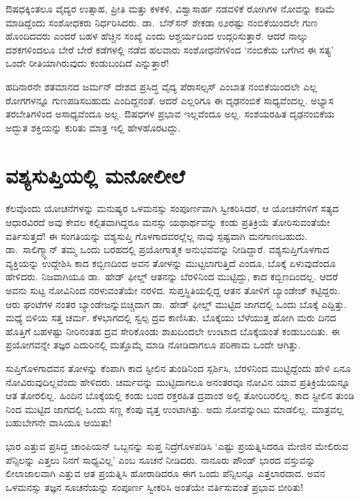 ಔಷಧಕ್ಕಿಂತಲೂ ವೈದ್ಯರ ಉತ್ಸಾಹ, ಪ್ರೀತಿ ಮತ್ತು ಕಳಕಳಿ, ವಿಶ್ವಾಸಾರ್ಹ ನಡವಳಿಕೆ ರೋಗಿಗಳ ನೋವನ್ನು ಕಡಿಮೆ ಮಾಡಿದ್ದೆಂದು ಸಂಶೋಧಕರು ನಿರ್ಧರಿಸಿದರು. ಡಾ.\ ಬೆನ್​ಸನ್ ಶೇಕಡಾ ೮೨ರಷ್ಟು ನಂಬಿಕೆಯಿಂದಲೇ ಗುಣ ಹೊಂದಿದವರು ಎಂದರೆ ಬಹಳ ಹೆಚ್ಚಿನ ಸಂಖ್ಯೆ ಎಂದು ಆಶ್ಚರ್ಯದಿಂದ ಉದ್ಗರಿಸುತ್ತಾರೆ. ಆದರೆ ನಾಲ್ಕು ದಶಕಗಳಿಂದಲೂ ಬೇರೆ ಬೇರೆ ಕಡೆಗಳಲ್ಲಿ ನಡೆದ ಹಲವಾರು ಸಂಶೋಧನೆಗಳಿಂದ ‘ನಂಬಿಕೆಯ ಬಗೆಗಿನ ಈ ಸತ್ಯ’ ಒಂದೇ ರೀತಿಯಾಗಿರುವುದು ಕಂಡುಬಂದಿದೆ ಎನ್ನುತ್ತಾರೆ!

ಹದಿನಾರನೇ ಶತಮಾನದ ಜರ್ಮನ್ ದೇಶದ ಪ್ರಸಿದ್ಧ ವೈದ್ಯ ಪೆರಾಸಲ್ಸಸ್ ಎಂಬಾತ ನಂಬಿಕೆ\-ಯಿಂದಲೇ ಎಲ್ಲ ರೋಗಗಳನ್ನೂ ಗುಣಪಡಿಸಬಹುದು ಎಂದಿದ್ದನಂತೆ. ಆದರೆ ಎಲ್ಲರಿಗೂ ಈ ದೃಢನಂಬಿಕೆ ಸಾಧ್ಯವೆಂದಲ್ಲ. ಅಭ್ಯಾಸ ತರಬೇತಿಗಳಿಂದ ಅಸಾಧ್ಯವೆಂದೂ ಅಲ್ಲ. ಔಷಧಗಳ ಪ್ರಭಾವ ಇಲ್ಲವೆಂದೂ ಅಲ್ಲ. ಸಂಶಯರಹಿತ ದೃಢನಂಬಿಕೆಯ ಅದ್ಭುತ ಶಕ್ತಿಯನ್ನು ಕುರಿತು ಮಾತ್ರ ಇಲ್ಲಿ ಹೇಳಹೊರಟದ್ದು.


\section*{ವಶ್ಯಸುಪ್ತಿಯಲ್ಲಿ ಮನೋಲೀಲೆ}


ಕೆಲವೊಂದು ಯೋಚನೆಗಳನ್ನು ಮನುಷ್ಯರ ಒಳಮನಸ್ಸು ಸಂಪೂರ್ಣವಾಗಿ ಸ್ವೀಕರಿಸಿದರೆ, ಆ ಯೋಚನೆಗಳಿಗೆ ಸತ್ಯದ ಆಧಾರವಿರದೆ ಅವು ಕೇವಲ ಕಲ್ಪಿತವಾಗಿದ್ದರೂ ಮನಸ್ಸು ಯಥಾರ್ಥವನ್ನು ಕಂಡು ಪ್ರತಿಕ್ರಿಯೆ ತೋರಿಸುವಂತೆಯೇ ವರ್ತಿಸುತ್ತದೆ! ಈ ಸಂಗತಿಯನ್ನು ವಶ್ಯಸುಪ್ತಿ ಗೊಳಗಾದವರಲ್ಲೆಲ್ಲ ನಾವು ಸ್ಪಷ್ಟವಾಗಿ ಮನಗಾಣಬಹುದು. ಡಾ.\ ಸಾಲಿಗ್ಮ್ಯಾನ್ ತಮ್ಮ ಒಂದು ಬರಹದಲ್ಲಿ ಪ್ರಯೋಗಾತ್ಮಕ ಅನುಭವವನ್ನು ನೀಡಿದ್ದಾರೆ. ವಶ್ಯಸುಪ್ತಿಗೊಳಗಾದ ವ್ಯಕ್ತಿಯನ್ನು ಉದ್ದೇಶಿಸಿ ಕಾದ ಕಬ್ಬಿಣದಿಂದ ಅವನ ತೋಳನ್ನು ಮುಟ್ಟಲಾಗುತ್ತಿದೆ ಎಂದೂ, ಬೊಕ್ಕೆ ಏಳುವುದೆಂದೂ ಹೇಳಿದರು. ನಿಜವಾಗಿಯೂ ಡಾ.\ ಹೇಡ್ ಫೀಲ್ಡ್ ಆತನನ್ನು ಬೆರಳಿನಿಂದ ಮುಟ್ಟಿದ್ದು, ಕಾದ ಕಬ್ಬಿಣದಿಂದಲ್ಲ. ಆದರೆ ಅವನು ಸುಟ್ಟ ನೋವಿನಿಂದ ನರಳುವಂತೆಯೇ ನರಳಿದ. ಸುಪ್ತಸ್ಥಿತಿಯಲ್ಲಿದ್ದ ಆತನ ತೋಳಿಗೆ ಬ್ಯಾಂಡೇಜ್ ಕಟ್ಟಿದ್ದರು. ಆರು ಘಂಟೆಗಳ ನಂತರ ಬ್ಯಾಂಡೇಜನ್ನು\break ಬಿಚ್ಚಿದಾಗ ಡಾ.\ ಹೇಡ್ ಫೀಲ್ಡ್ ಮುಟ್ಟಿದ ಜಾಗದಲ್ಲಿ ಒಂದು ಬೊಕ್ಕೆ ಎದ್ದಿತ್ತು. ಮಧ್ಯೆ ಬಿಳಿಯ ಸತ್ತ ಚರ್ಮ. ಕೆಳಭಾಗದಲ್ಲಿ ಸ್ವಲ್ಪ ದ್ರವ ಕಾಣಿಸಿತು. ಬೊಕ್ಕೆಯು ಬೆಳೆಯುತ್ತ ಹೋಗಿ ಮರು ದಿನದ ಹೊತ್ತಿಗೆ ಬಹಳಷ್ಟು ನೀರಿನಂತಹ ದ್ರವ ಸೇರಿಕೊಂಡು ಶಾಖದಿಂದಲೇ ಉಂಟಾದ ಬೊಕ್ಕೆಯಂತೆ ಕಂಡುಬಂದಿತು. ಈ ಪ್ರಯೋಗವನ್ನೇ ತಜ್ಞರ ಎದುರಿನಲ್ಲಿ ಮತ್ತೊಮ್ಮೆ ಮಾಡಿ ನೋಡಿದಾಗಲೂ ಪರಿಣಾಮ ಒಂದೇ ಆಗಿತ್ತು.

ಸುಪ್ತಿಗೊಳಗಾದವನ ತೋಳನ್ನು ಕೆಂಪಾಗಿ ಕಾದ ಸ್ಟೀಲಿನ ತುಂಡಿನಿಂದ ಸ್ಪರ್ಶಿಸಿ, ಬೆರಳಿನಿಂದ ಮುಟ್ಟಿದ್ದೆಂದು ಹೇಳಿ ಏನೂ ನೋವಿರುವುದಿಲ್ಲವೆಂದು ಹೇಳಿದರು. ಚರ್ಮವನ್ನು ಮುಟ್ಟಿದಾಗಲೂ ಅನಂತರವೂ ನೋವಿನ ಯಾವ ಪ್ರತಿಕ್ರಿಯೆಯನ್ನೂ ಆತ ತೋರಲಿಲ್ಲ. ಹಿಂದಿನ ಬೊಕ್ಕೆಯಲ್ಲಿ ಕಂಡು ಬಂದ ರಕ್ತರಹಿತ ದ್ರವಾಂಶ ಅಲ್ಲಿ ತೋರಿಬರಲಿಲ್ಲ. ಕಾದ ಸ್ಟೀಲಿನ ತುಂಡಿ ನಿಂದ ಮುಟ್ಟಿದ ಜಾಗದಲ್ಲಿ ಒಂದು ಸಣ್ಣ ಕೆಂಪು ವೃತ್ತ ಉಂಟಾಗಿತ್ತು. ಅದು ನೋವನ್ನುಂಟು ಮಾಡಲಿಲ್ಲ. ಮಾತ್ರವಲ್ಲ ಬಹುಬೇಗನೇ ವಾಸಿಯೂ ಆಯಿತು!

ಭಾರ ಎತ್ತುವ ಪ್ರಸಿದ್ಧ ಚಾಂಪಿಯನ್ ಒಬ್ಬನನ್ನು ಸುಪ್ತ ನಿದ್ರೆಗೊಳಪಡಿಸಿ ‘ಎಷ್ಟು ಪ್ರಯತ್ನಿ\-ಸಿದರೂ ಮೇಜಿನ ಮೇಲಿರುವ ಪೆನ್ಸಿಲನ್ನು ಎತ್ತಲು ನಿನಗೆ ಸಾಧ್ಯವಿಲ್ಲ’ ಎಂಬ ಸೂಚನೆ ನೀಡಿದರು. ನಾನೂರು ಪೌಂಡ್ ಭಾರದ ವಸ್ತುವನ್ನು ಲೀಲಾಜಾಲವಾಗಿ ಎತ್ತುವ ಆತ ಪ್ರಯತ್ನಿಸಿ ಹೋರಾಡಿದರೂ ಈಗ ಒಂದು ಪೆನ್ಸಿಲನ್ನೂ ಎತ್ತಲಾರದಾದ. ಅವನ ಒಳಮನಸ್ಸು ತಜ್ಞನ ಸೂಚನೆಯನ್ನು ಸಂಪೂರ್ಣ ಸ್ವೀಕರಿಸಿ ಅಂತೆಯೇ ವರ್ತಿಸುವಂತೆ ಪ್ರಭಾವ ಬೀರಿತು!

